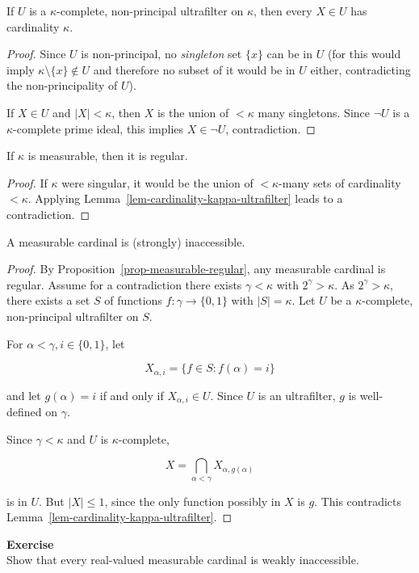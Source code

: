 \begin{lemma}\label{lem-cardinality-kappa-ultrafilter}If $U$ is a $\kappa$-complete, non-principal ultrafilter on $\kappa$, then every $X \in U$ has cardinality $\kappa$.

\end{lemma}\begin{proof}Since $U$ is non-principal, no \textit{singleton} set $\{x\}$ can be in $U$ (for this would imply $\kappa\setminus \{x\} \notin U$ and therefore no subset of it would be in $U$ either, contradicting the non-principality of $U$).

If $X \in U$ and $|X| < \kappa$, then $X$ is the union of $< \kappa$ many singletons. Since $\neg U$ is a $\kappa$-complete prime ideal, this implies $X \in \neg U$, contradiction.

\end{proof}\begin{proposition}\label{prop-measurable-regular}If $\kappa$ is measurable, then it is regular.

\end{proposition}\begin{proof}If $\kappa$ were singular, it would be the union of $<\kappa$-many sets of cardinality $<\kappa$. Applying Lemma~\ref{lem-cardinality-kappa-ultrafilter} leads to a contradiction.

\end{proof}\begin{theorem}\label{thm-measurable-inaccessible}A measurable cardinal is (strongly) inaccessible.

\end{theorem}\begin{proof}By Proposition~\ref{prop-measurable-regular}, any measurable cardinal is regular. Assume for a contradiction there exists $\gamma < \kappa$ with $2^\gamma > \kappa$. As $2^\gamma > \kappa$, there exists a set $S$ of functions $f: \gamma \to \{0,1\}$ with $|S| = \kappa$. Let $U$ be a $\kappa$-complete, non-principal ultrafilter on $S$.

For $\alpha < \gamma, i \in \{0,1\}$, let

\begin{equation}
X_{\alpha,i} = \{ f \in S \colon f(\alpha) = i\}
\end{equation}

and let $g(\alpha) = i$ if and only if $X_{\alpha,i} \in U$. Since $U$ is an ultrafilter, $g$ is well-defined on $\gamma$.

Since $\gamma < \kappa$ and $U$ is $\kappa$-complete,

\begin{equation}
X = \bigcap_{\alpha < \gamma} X_{\alpha, g(\alpha)}
\end{equation}

is in $U$. But $|X| \leq 1$, since the only function possibly in $X$ is $g$. This contradicts Lemma~\ref{lem-cardinality-kappa-ultrafilter}.

\end{proof}\begin{framed}
\textbf{Exercise}\\
Show that every real-valued measurable cardinal is weakly inaccessible.
\end{framed}


